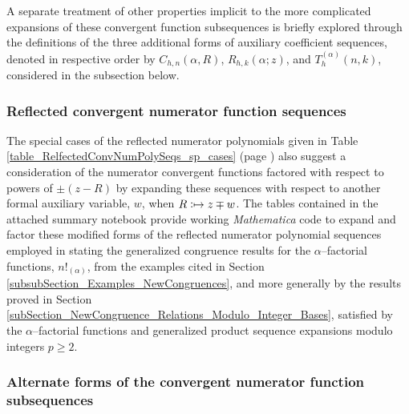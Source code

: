 \documentclass[12pt,reqno]{article}
\numberwithin{sfootnote}{section}
\newcommand{\tableref}[1]{Table \ref{#1} (page \pageref{#1})}
\numberwithin{equation}{section}
\theoremstyle{DefaultTheoremStyle}
\theoremstyle{definition}
\newcommand{\defmapsto}{\ensuremath{\vcentcolon\mapsto}}
\newcommand{\Mm}[0]{\emph{Mathematica}}
\newcommand{\MultiFactorial}[2]{\ensuremath{#1!_{\left(#2\right)}}}
\begin{document}
A separate treatment of other properties implicit to the 
more complicated expansions of these convergent function 
subsequences is briefly 
explored through the definitions of the three additional forms of 
auxiliary coefficient sequences, denoted in respective order by 
$C_{h,n}(\alpha, R)$, $R_{h,k}(\alpha; z)$, and $T_h^{(\alpha)}(n, k)$, 
considered in the subsection below. 

\subsubsection{Reflected convergent numerator function sequences} 

The special cases of the reflected numerator polynomials given in 
\tableref{table_RelfectedConvNumPolySeqs_sp_cases} also 
suggest a consideration of the numerator convergent functions 
factored with respect to powers of $\pm (z-R)$ 
by expanding these sequences with respect to 
another formal auxiliary variable, $w$, when $R \defmapsto z \mp w$. 
The tables contained in the attached summary notebook 
provide working \Mm{} 
code to expand and factor these modified forms of the 
reflected numerator polynomial sequences employed in stating the 
generalized congruence results for the $\alpha$--factorial functions, 
$\MultiFactorial{n}{\alpha}$, from the examples cited in 
Section \ref{subsubSection_Examples_NewCongruences}, and 
more generally by the results proved in 
Section \ref{subSection_NewCongruence_Relations_Modulo_Integer_Bases}, 
satisfied by the $\alpha$--factorial functions and 
generalized product sequence expansions modulo integers $p \geq 2$. 

\subsubsection{Alternate forms of the 
               convergent numerator function subsequences}
\label{subsubSection_Properties_Of_ConvFn_Phz-AuxNumFn_Subsequences} 
\end{document}
